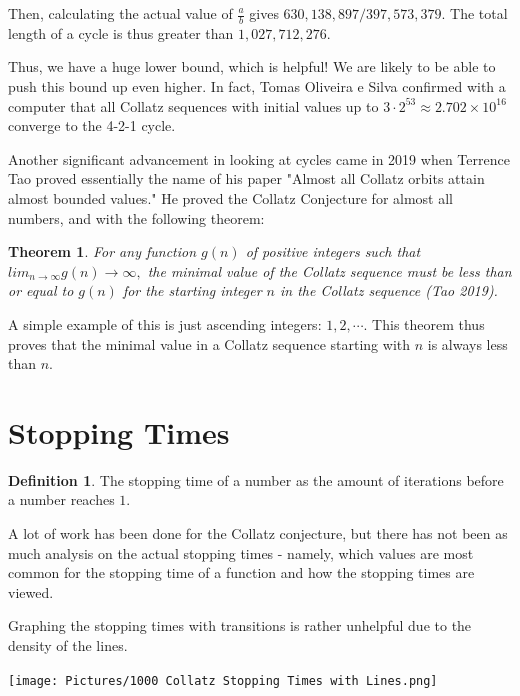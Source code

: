 \documentclass{article}
\newtheorem{theorem}{Theorem}
\theoremstyle{remark}
\theoremstyle{problem}
\numberwithin{problem}{subsection}
\numberwithin{Problem}{section}
\theoremstyle{definition}
\newtheorem*{definition}{Definition}
\theoremstyle{definition}
\theoremstyle{definition}
\begin{document}
Then, calculating the actual value of $\frac{a}{b}$ gives $630,138,897/397,573,379.$ The total length of a cycle is thus greater than $1,027,712,276.$

Thus, we have a huge lower bound, which is helpful! We are likely to be able to push this bound up even higher. In fact, Tomas Oliveira e Silva confirmed with a computer that all Collatz sequences with initial values up to $3 \cdot 2^{53} \approx 2.702 \times 10^{16}$ converge to the 4-2-1 cycle.

Another significant advancement in looking at cycles came in 2019 when Terrence Tao proved essentially the name of his paper "Almost all Collatz orbits attain almost bounded values." He  proved the Collatz Conjecture for almost all numbers, and with the following theorem: 

\begin{theorem}
    For any function $g(n)$ of positive integers such that $lim_{n \to \infty} g(n) \to \infty,$ the minimal value of the Collatz sequence must be less than or equal to $g(n)$ for the starting integer $n$ in the Collatz sequence (Tao 2019).
\end{theorem}

A simple example of this is just ascending integers: $1, 2, \cdots$. This theorem thus proves that the minimal value in a Collatz sequence starting with $n$ is always less than $n.$ 



\section{Stopping Times}

\begin{definition}
    The stopping time of a number as the amount of iterations before a number reaches $1.$ 
\end{definition}

A lot of work has been done for the Collatz conjecture, but there has not been as much analysis on the actual stopping times - namely, which values are most common for the stopping time of a function and how the stopping times are viewed. 

Graphing the stopping times with transitions is rather unhelpful due to the density of the lines. 

\begin{centering}
\texttt{[image: Pictures/1000 Collatz Stopping Times with Lines.png]}
\end{centering}
\end{document}
